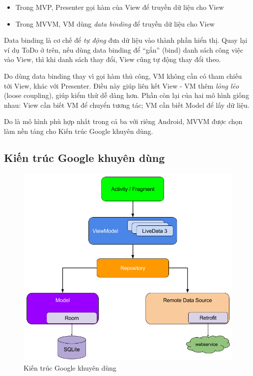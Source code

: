 \documentclass[../../thesis]{subfiles}
\begin{document}
\begin{itemize}
    \item
          Trong MVP, Presenter gọi hàm của View để truyền dữ liệu cho View
\end{itemize}

\begin{itemize}[resume, before = \vspace*{-\dimexpr\topsep+\partopsep\relax}]
    \item
          Trong MVVM, VM dùng \emph{data binding} để truyền dữ liệu cho View
\end{itemize}

Data binding là cơ chế để \emph{tự động} đưa dữ liệu vào thành phần hiển thị.
Quay lại ví dụ ToDo ở trên, nếu dùng data binding để ``gắn'' (bind) danh sách
công việc vào View, thì khi danh sách thay đổi, View cũng tự động thay đổi theo.

Do dùng data binding thay vì gọi hàm thủ công, VM không cần có tham chiếu tới
View, khác với Presenter. Điều này giúp liên kết View - VM thêm \emph{lỏng lẻo}
(loose coupling), giúp kiểm thử dễ dàng hơn. Phần còn lại của hai mô hình giống
nhau: View cần biết VM để chuyển tương tác; VM cần biết Model để lấy dữ liệu.

Do là mô hình phù hợp nhất trong cả ba với riêng Android, MVVM được chọn làm nền
tảng cho Kiến trúc Google khuyên dùng.

\subsection{Kiến trúc Google khuyên dùng}\label{sec:app-arch}

\begin{figure}
    \centering
    \vspace*{-6mm}
    \includegraphics[width=\linewidth]{../images/final-architecture.png}
    \vspace*{-10mm}
    \caption{Kiến trúc Google khuyên dùng \cite{GOOGL_APP_ARCH}}
    \label{fig:google-recom-arch}
\end{figure}
\end{document}

